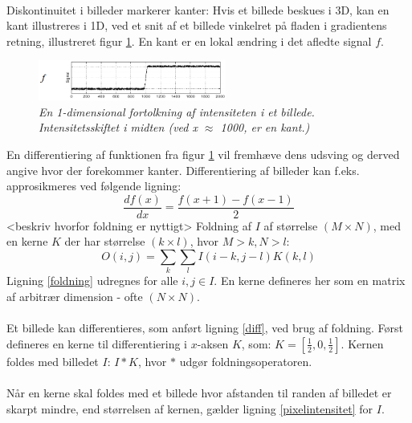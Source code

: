 \\
Diskontinuitet i billeder markerer kanter: Hvis et billede beskues i 3D, kan en kant illustreres i 1D, ved et snit af et billede vinkelret på fladen i gradientens retning, illustreret figur \ref{fig:kant}. En kant er en lokal ændring i det afledte signal $f$.
\noindent
\begin{figure}[H]
    \centering
    \includegraphics[width=0.55\textwidth]{fig/7.png}
     \vspace{-1em}
    \begin{center}        
     \caption{{\footnotesize \textit{
En 1-dimensional fortolkning af intensiteten i et billede. Intensitetsskiftet i midten (ved x $\approx$ 1000, er en kant.)}}}
    \label{fig:kant}
     \end{center}
       \vspace{-2.5em}
  \end{figure}
\noindent
En differentiering af funktionen fra figur \ref{fig:kant} vil fremhæve dens udsving og derved angive hvor der forekommer kanter. Differentiering af billeder kan f.eks. approsikmeres ved følgende ligning:
\begin{equation}
\dfrac{df(x)}{dx}=\dfrac{f(x+1)-f(x-1)}{2}
\label{diff}
\end{equation}
<beskriv hvorfor foldning er nyttigt>
Foldning af $I$ af størrelse $(M \times N)$, med en kerne $K$ der har størrelse $(k \times l)$, hvor $M > k, N > l$:
\begin{equation}
O(i,j) = \sum_{k} \sum_{l} I(i-k, j-l) K(k,l)
\label{foldning}
\end{equation}
Ligning \eqref{foldning} udregnes for alle $i,j \in I$. En kerne defineres her som en matrix af arbitrær dimension - ofte $(N\times N)$. 
\\
\\
Et billede kan differentieres, som anført ligning \eqref{diff}, ved brug af foldning. Først defineres en kerne til differentiering i $x$-aksen $K$, som: $K = [\frac{1}{2}, 0, \frac{1}{2}]$. Kernen foldes med billedet $I$: $I \ast K $, hvor $\ast$ udgør foldningsoperatoren.
\\
\\
Når en kerne skal foldes med et billede hvor afstanden til randen af billedet er skarpt mindre, end størrelsen af kernen, gælder ligning \eqref{pixelintensitet} for $I$.
